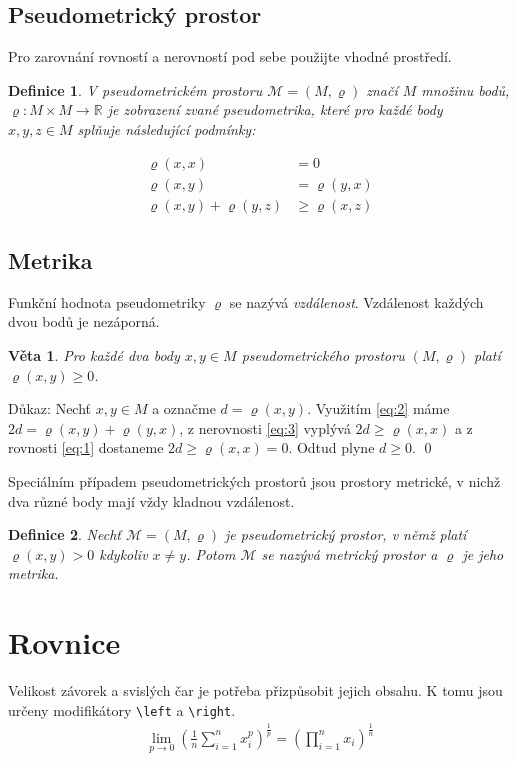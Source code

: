 \documentclass[a4paper,11pt,twocolumn]{article}
\newtheorem{definition}{Definice}
\newtheorem{veta}{Věta}
\begin{document}
\subsection{Pseudometrický prostor}
Pro zarovnání rovností a nerovností pod sebe použijte vhodné prostředí.

\begin{definition}
V \emph{pseudometrickém prostoru} $\mathcal{M} = (M, \varrho)$ značí $M$ množinu bodů,
$\varrho : M \times M \rightarrow \mathbb{R}$ je zobrazení zvané \emph{pseudometrika}, které pro každé body $x, y, z \in M$
splňuje následující podmínky:

\begin{align}
    \varrho(x,x) &= 0 \label{eq:1} \\
    \varrho(x,y) &= \varrho(y,x) \label{eq:2} \\
    \varrho(x,y) + \varrho(y,z) &\geq \varrho(x,z) \label{eq:3}
\end{align}
\end{definition}

\subsection{Metrika}
Funkční hodnota pseudometriky $\varrho$ se nazývá \textit{vzdálenost}.
Vzdálenost každých dvou bodů je nezáporná.

\begin{veta} \label{v:1}
Pro každé dva body $x,y \in M$ pseudometrického prostoru $(M,\varrho)$ platí $\varrho(x,y) \geq 0$.
\end{veta}

Důkaz: Nechť $x, y \in M$ a označme $d = \varrho(x,y)$. Využitím \eqref{eq:2} máme $2d = \varrho(x,y) + \varrho(y,x)$, z nerovnosti \eqref{eq:3} vyplývá $2d \geq \varrho(x,x)$ a z rovnosti \eqref{eq:1} dostaneme $2d \geq \varrho(x,x) = 0$. Odtud plyne $d \geq 0$. \qed

Speciálním případem pseudometrických prostorů jsou prostory metrické,
v nichž dva různé body mají vždy kladnou vzdálenost.

\begin{definition}
\label{def:2}
Nechť $\mathcal{M} = (M,\varrho)$ je pseudometrický prostor, v němž platí $\varrho(x,y) > 0$ kdykoliv $x \ne y$.
Potom $\mathcal{M}$ se nazývá \emph{metrický prostor}
a $\varrho$ je jeho \emph{metrika}.
\end{definition}

\section{Rovnice}
Velikost závorek a svislých čar je potřeba přizpůsobit jejich obsahu.
K tomu jsou určeny modifikátory \verb|\left| a \verb|\right|.
\begin{align}
    \lim_{p \rightarrow 0}
    \left( 
    \frac{1}{n}\sum^n_{i=1}{x^p_i} 
    \right)^\frac{1}{p}
    = 
    \left(
    \prod_{i=1}^n{x_i}
    \right)^\frac{1}{n}
\end{align}
\end{document}
